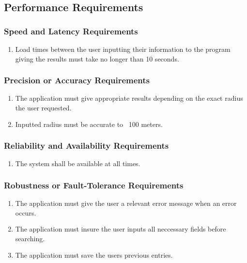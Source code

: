 \documentclass[english]{article}
\begin{document}

\subsection{Performance Requirements}
\label{sub:performance_requirements}

\subsubsection{Speed and Latency Requirements}
\label{ssub:speed_and_latency_requirements}
\begin{enumerate}[{SLR}1. ]
\item Load times between the user inputting their information to the program giving the results must take no longer than 10 seconds.
\end{enumerate}

\subsubsection{Precision or Accuracy Requirements}
\label{ssub:precision_or_accuracy_requirements}
\begin{enumerate}[{PAR}1. ]
\item The application must give appropriate results depending on the exact radius the user requested.

\item Inputted radius must be accurate to ~100 meters.
\end{enumerate}

\subsubsection{Reliability and Availability Requirements}
\label{ssub:reliability_and_availability_requirements}
\begin{enumerate}[{RAR}1. ]
\item The system shall be available at all times.
\end{enumerate}

\subsubsection{Robustness or Fault-Tolerance Requirements}
\label{ssub:robustness_or_fault_tolerance_requirements}
\begin{enumerate}[{RFR}1. ]
\item The application must give the user a relevant error message when an error occurs.

\item The application must insure the user inputs all neccessary fields before searching.

\item The application must save the users previous entries.

\end{enumerate}
\end{document}
